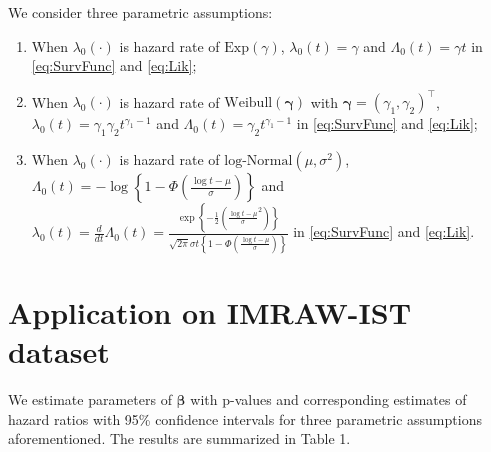 \documentclass[11pt]{article}
\newcommand{\bbeta}{{\bm \beta}}
\newcommand{\bgamma}{{\bm \gamma}}
\begin{document}
We consider three parametric assumptions:

\begin{enumerate}
\item When $\lambda_0(\cdot)$ is hazard rate of $\text{Exp}(\gamma)$, 
  $\lambda_0(t)=\gamma$ and $\Lambda_0(t)=\gamma t$ in \eqref{eq:SurvFunc} and \eqref{eq:Lik};
\item When $\lambda_0(\cdot)$ is hazard rate of $\text{Weibull}(\bgamma)$ with
  $\bgamma=(\gamma_1,\gamma_2)^{\top}$, $\lambda_0(t)=\gamma_1\gamma_2
  t^{\gamma_1 - 1}$ and $\Lambda_0(t) = \gamma_2 t^{\gamma_1-1}$ in \eqref{eq:SurvFunc} and \eqref{eq:Lik};
\item When $\lambda_0(\cdot)$ is hazard rate of
  $\text{log-Normal}(\mu,\sigma^2)$, $\Lambda_0(t) = -\log \left\{ 1- \Phi
    \left( \frac{\log t - \mu}{\sigma} \right)\right\}$ and $\lambda_0(t) =
  \frac{d}{dt}\Lambda_0(t) = \frac{\exp \left\{ -\frac{1}{2} \left( \frac{\log t
      - \mu}{\sigma}^2 \right)\right\}}{\sqrt{2\pi}\sigma t \left\{ 1-\Phi \left(
      \frac{\log t - \mu}{\sigma} \right) \right\}}$ in \eqref{eq:SurvFunc} and \eqref{eq:Lik}.
\end{enumerate}

\section{Application on IMRAW-IST dataset}
We estimate parameters of $\bbeta$ with p-values and corresponding estimates of
hazard ratios with 95\% confidence intervals for three parametric assumptions
aforementioned. The results are summarized in Table 1.
\end{document}
